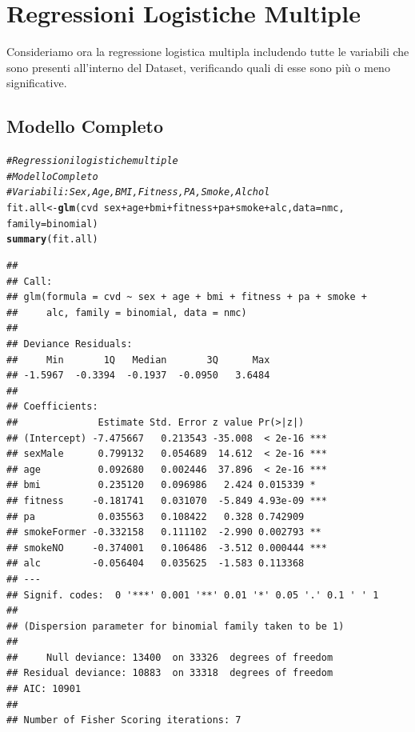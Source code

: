 \documentclass{article}\usepackage[]{graphicx}\usepackage[]{xcolor}
\makeatletter
\newcommand{\hlcom}[1]{\textcolor[rgb]{0.678,0.584,0.686}{\textit{#1}}}%
\newcommand{\hlopt}[1]{\textcolor[rgb]{0,0,0}{#1}}%
\newcommand{\hlstd}[1]{\textcolor[rgb]{0.345,0.345,0.345}{#1}}%
\newcommand{\hlkwb}[1]{\textcolor[rgb]{0.69,0.353,0.396}{#1}}%
\newcommand{\hlkwc}[1]{\textcolor[rgb]{0.333,0.667,0.333}{#1}}%
\newcommand{\hlkwd}[1]{\textcolor[rgb]{0.737,0.353,0.396}{\textbf{#1}}}%
\newenvironment{kframe}{%
 \def\at@end@of@kframe{}%
 \ifinner\ifhmode%
  \def\at@end@of@kframe{\end{minipage}}%
  \begin{minipage}{\columnwidth}%
 \fi\fi%
 \def\FrameCommand##1{\hskip\@totalleftmargin \hskip-\fboxsep
 \colorbox{shadecolor}{##1}\hskip-\fboxsep
     \hskip-\linewidth \hskip-\@totalleftmargin \hskip\columnwidth}%
 \MakeFramed {\advance\hsize-\width
   \@totalleftmargin\z@ \linewidth\hsize
   \@setminipage}}%
 {\par\unskip\endMakeFramed%
 \at@end@of@kframe}
\newenvironment{knitrout}{}{} %
\makeatother
\begin{document}
\clearpage


\section{Regressioni Logistiche Multiple}
  Consideriamo ora la regressione logistica multipla includendo tutte le variabili
  che sono presenti all'interno del Dataset, verificando quali di esse sono più 
  o meno significative.
  
  \subsection{Modello Completo}
\begin{knitrout}
\color{fgcolor}\begin{kframe}
\begin{alltt}
\hlcom{#Regressioni logistiche multiple}
\hlcom{#Modello Completo}
\hlcom{#Variabili: Sex, Age, BMI, Fitness, PA, Smoke, Alchol}
\hlstd{fit.all} \hlkwb{<-} \hlkwd{glm}\hlstd{(cvd}\hlopt{~}\hlstd{sex}\hlopt{+}\hlstd{age}\hlopt{+}\hlstd{bmi}\hlopt{+}\hlstd{fitness}\hlopt{+}\hlstd{pa}\hlopt{+}\hlstd{smoke}\hlopt{+}\hlstd{alc,} \hlkwc{data}\hlstd{=nmc,}
               \hlkwc{family}\hlstd{=binomial)}
\hlkwd{summary}\hlstd{(fit.all)}
\end{alltt}
\begin{verbatim}
## 
## Call:
## glm(formula = cvd ~ sex + age + bmi + fitness + pa + smoke + 
##     alc, family = binomial, data = nmc)
## 
## Deviance Residuals: 
##     Min       1Q   Median       3Q      Max  
## -1.5967  -0.3394  -0.1937  -0.0950   3.6484  
## 
## Coefficients:
##              Estimate Std. Error z value Pr(>|z|)    
## (Intercept) -7.475667   0.213543 -35.008  < 2e-16 ***
## sexMale      0.799132   0.054689  14.612  < 2e-16 ***
## age          0.092680   0.002446  37.896  < 2e-16 ***
## bmi          0.235120   0.096986   2.424 0.015339 *  
## fitness     -0.181741   0.031070  -5.849 4.93e-09 ***
## pa           0.035563   0.108422   0.328 0.742909    
## smokeFormer -0.332158   0.111102  -2.990 0.002793 ** 
## smokeNO     -0.374001   0.106486  -3.512 0.000444 ***
## alc         -0.056404   0.035625  -1.583 0.113368    
## ---
## Signif. codes:  0 '***' 0.001 '**' 0.01 '*' 0.05 '.' 0.1 ' ' 1
## 
## (Dispersion parameter for binomial family taken to be 1)
## 
##     Null deviance: 13400  on 33326  degrees of freedom
## Residual deviance: 10883  on 33318  degrees of freedom
## AIC: 10901
## 
## Number of Fisher Scoring iterations: 7
\end{verbatim}
\end{kframe}
\end{knitrout}
    
\end{document}
